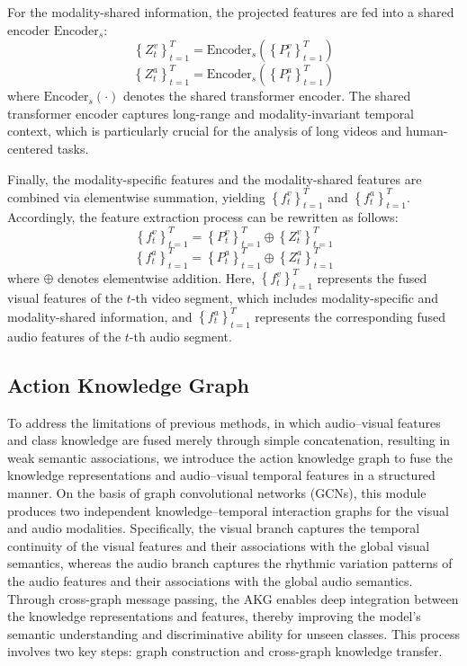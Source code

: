 \documentclass[lettersize,journal]{IEEEtran}
\begin{document}
For the modality-shared information, the projected features are fed into a shared encoder $\text{Encoder}_s$:
\begin{equation}
\left\{ Z_t^v \right\}_{t=1}^T = \text{Encoder}_s \left( \left\{ P_t^v \right\}_{t=1}^T \right)
\end{equation}
\begin{equation}
\left\{ Z_t^a \right\}_{t=1}^T = \text{Encoder}_s \left( \left\{ P_t^a \right\}_{t=1}^T \right)
\end{equation}
where $\text{Encoder}_s(\cdot)$ denotes the shared transformer encoder. The shared transformer encoder\cite{33} captures long-range and modality-invariant temporal context, which is particularly crucial for the analysis of long videos and human-centered tasks.


Finally, the modality-specific features and the modality-shared features are combined via elementwise summation, yielding $\left\{ f_t^v \right\}_{t=1}^T$ and $\left\{ f_t^a \right\}_{t=1}^T$. Accordingly, the feature extraction process can be rewritten as follows:
\begin{equation}
\left\{ f_t^v \right\}_{t=1}^T = \left\{ P_t^v \right\}_{t=1}^T \oplus \left\{ Z_t^v \right\}_{t=1}^T
\end{equation}
\begin{equation}
\left\{ f_t^a \right\}_{t=1}^T = \left\{ P_t^a \right\}_{t=1}^T \oplus \left\{ Z_t^a \right\}_{t=1}^T
\end{equation}
where $\oplus$ denotes elementwise addition. Here, $\left\{ f_t^v \right\}_{t=1}^T$ represents the fused visual features of the $t$-th video segment, which includes modality-specific and modality-shared information, and $\left\{ f_t^a \right\}_{t=1}^T$ represents the corresponding fused audio features of the $t$-th audio segment.


\subsection{Action Knowledge Graph}
To address the limitations of previous methods, in which audio–visual features and class knowledge are fused merely through simple concatenation, resulting in weak semantic associations, we introduce the action knowledge graph to fuse the knowledge representations and audio–visual temporal features in a structured manner. On the basis of graph convolutional networks (GCNs), this module produces two independent knowledge–temporal interaction graphs for the visual and audio modalities. Specifically, the visual branch captures the temporal continuity of the visual features and their associations with the global visual semantics, whereas the audio branch captures the rhythmic variation patterns of the audio features and their associations with the global audio semantics. Through cross-graph message passing, the AKG enables deep integration between the knowledge representations and features, thereby improving the model’s semantic understanding and discriminative ability for unseen classes. This process involves two key steps: graph construction and cross-graph knowledge transfer.
\end{document}
